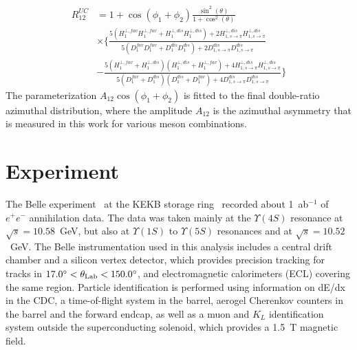 \documentclass[aps,prX,preprint,groupedaddress,linenumbers]{revtex4-1}
\begin{document}
\begin{equation}
\begin{aligned}
R^{UC}_{12}&=1+\cos(\phi_1+\phi_2)\frac{\sin^2(\theta)}{1+\cos^2(\theta)}\\
&\times\bigg\{\frac{5(H^{\bot,fav}_1H^{\bot,fav}_1+H^{\bot,dis}_1H^{\bot,dis}_1)+2H^{\bot,dis}_{1,s\rightarrow\pi}H^{\bot,dis}_{1,s\rightarrow\pi}}{5(D^{fav}_1D^{fav}_1+D^{dis}_1D^{dis}_1)+2D^{dis}_{1,s\rightarrow\pi}D^{dis}_{1,s\rightarrow\pi}}\\
&-\frac{5(H^{\bot,fav}_1+H^{\bot,dis}_1)(H^{\bot,dis}_1+H^{\bot,fav}_1)+4H^{\bot,dis}_{1,s\rightarrow\pi}H^{\bot,dis}_{1,s\rightarrow\pi}}{5(D^{fav}_1+D^{dis}_1)(D^{dis}_1+D^{fav}_1)+4D^{dis}_{1,s\rightarrow\pi}D^{dis}_{1,s\rightarrow\pi}} \bigg\}
\end{aligned}
\label{eqn:allratiosexpress3}
\end{equation}
The parameterization $A_{12} \cos(\phi_1+\phi_2)$ is fitted to the final double-ratio azimuthal distribution, where the amplitude $A_{12}$ is the azimuthal asymmetry that is measured in this work for various meson combinations. 




\section{Experiment}
The Belle experiment~\cite{BelleDetector} at the KEKB storage ring~\cite{KEKB} recorded about 1~ab$^{-1}$ of $e^+e^-$ annihilation data. The data was taken mainly at the $\Upsilon(4S)$ resonance at $\sqrt{s}=10.58$~GeV, but also at $\Upsilon(1S)$ to $\Upsilon(5S)$ resonances and at $\sqrt{s}=10.52$~GeV.
The Belle instrumentation used in this analysis includes a central drift chamber and a silicon vertex detector, which provides precision tracking for tracks in $17.0\degree < \theta_\textrm{Lab}< 150.0\degree$, 
and electromagnetic calorimeters (ECL) covering the same region. %
Particle identification is performed using information on dE/dx in the CDC, a time-of-flight system in the barrel, aerogel Cherenkov counters in the barrel and the forward endcap, as well as a muon and $K_L$ identification system outside the superconducting solenoid, which provides a 1.5~T magnetic field.
\label{sec:experiment}
\end{document}

